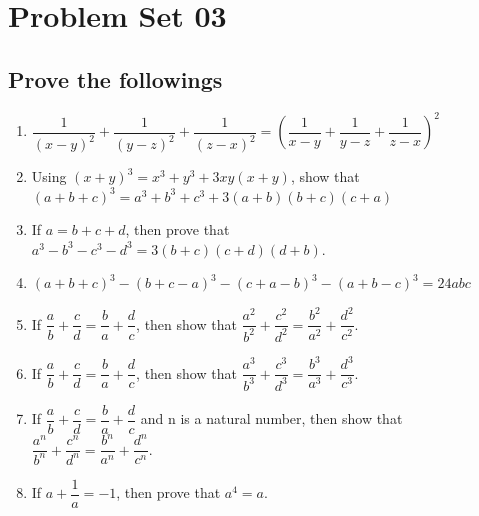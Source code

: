\newpage
\section{Problem Set 03}
		\subsection*{Prove the followings}
		\begin{enumerate}
			\item \(\dfrac{1}{(x-y)^{2}}+\dfrac{1}{(y-z)^{2}}+\dfrac{1}{(z-x)^{2}}=\left(\dfrac{1}{x-y}+\dfrac{1}{y-z}+\dfrac{1}{z-x}\right)^{2}\)
			
			\item Using $(x+y)^3=x^3+y^3+3xy(x+y)$, show that \((a+b+c)^3=a^3+b^3+c^3+3(a+b)(b+c)(c+a)\)
			
			\item If $a=b+c+d$, then prove that $a^3-b^3-c^3-d^3=3(b+c)(c+d)(d+b)$.
			
			\item \((a+b+c)^3-(b+c-a)^3-(c+a-b)^3-(a+b-c)^3=24abc\) 
			
			\item If $\dfrac{a}{b}+\dfrac{c}{d}=\dfrac{b}{a}+\dfrac{d}{c}$, then show that $\dfrac{a^2}{b^2}+\dfrac{c^2}{d^2} =\dfrac{b^2}{a^2}+\dfrac{d^2}{c^2}$.
			
			\item If $\dfrac{a}{b}+\dfrac{c}{d}=\dfrac{b}{a}+\dfrac{d}{c}$, then show that $\dfrac{a^3}{b^3}+\dfrac{c^3}{d^3} =\dfrac{b^3}{a^3}+\dfrac{d^3}{c^3}$.
			
			\item If $\dfrac{a}{b}+\dfrac{c}{d}=\dfrac{b}{a}+\dfrac{d}{c}$ and n is a natural number, then show that $\dfrac{a^n}{b^n}+\dfrac{c^n}{d^n} =\dfrac{b^n}{a^n}+\dfrac{d^n}{c^n}$.
			
			\item If $a+\dfrac{1}{a}=-1$, then prove that $a^4=a$.
			

\end{enumerate}
